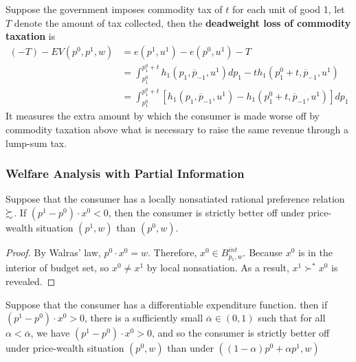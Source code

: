 \documentclass{article}
\begin{document}
 			\begin{definition}
 				Suppose the government imposes commodity tax of $t$ for each unit of good 1, let $T$ denote the amount of tax collected, then the \textbf{deadweight loss of commodity taxation} is 
 				\begin{align}
 					(-T)-E V\left(p^{0}, p^{1}, w\right) &=e\left(p^{1}, u^{1}\right)-e\left(p^{0}, u^{1}\right)-T \\
 					&=\int_{p_{1}^{0}}^{p_{1}^{0}+t} h_{1}\left(p_{1}, \overline{p}_{-1}, u^{1}\right) d p_{1}-t h_{1}\left(p_{1}^{0}+t, \overline{p}_{-1}, u^{1}\right) \\
 					&=\int_{p_{1}^{0}}^{p_{1}^{0}+t}\left[h_{1}\left(p_{1}, \overline{p}_{-1}, u^{1}\right)-h_{1}\left(p_{1}^{0}+t, \overline{p}_{-1}, u^{1}\right)\right] d p_{1}
 				\end{align}
 				It measures the extra amount by which the consumer is made worse off by commodity taxation above what is necessary to raise the same revenue through a lump-sum tax.
 			\end{definition}
 			
 			\subsubsection{Welfare Analysis with Partial Information}
 			
 			\begin{proposition}[3.I.1]
 				Suppose that the consumer has a locally nonsatiated rational preference relation $\succsim$. If $(p^1-p^0) \cdot x^0 < 0$, then the consumer is strictly better off under price-wealth situation $(p^1, w)$ than $(p^0, w)$.
 			\end{proposition}
 			
 			\begin{proof}
 				By Walras' law, $p^0 \cdot x^0 = w$. Therefore, $x^0 \in B_{p_1, w}^{int}$. Because $x^0$ is in the interior of budget set, so $x^0 \neq x^1$ by local nonsatiation. As a result, $x^1 \succ^* x^0$ is revealed.
 			\end{proof}
 			
 			\begin{proposition}[3.I.2]
 				Suppose that the consumer has a differentiable expenditure function. then if $\left(p^{1}-p^{0}\right) \cdot x^{0}>0$, there is a sufficiently small $\overline{\alpha} \in (0, 1)$ such that for all $\alpha < \overline{\alpha}$, we have $\left(p^{1}-p^{0}\right) \cdot x^{0}>0$, and so the consumer is strictly better off under price-wealth situation $(p^0, w)$ than under $\left((1-\alpha) p^{0}+\alpha p^{1}, w\right)$
 			\end{proposition}
 			
\end{document}
